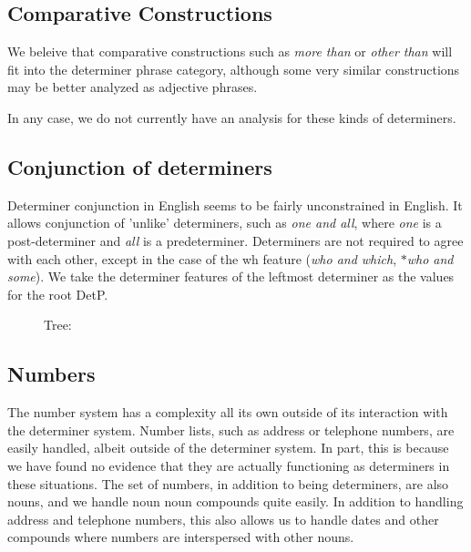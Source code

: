 \subsection{Comparative Constructions}

We beleive that comparative constructions such as {\it more than\/} or
{\it other than\/}
will fit into the determiner phrase category, although some very
similar constructions may be better analyzed  as adjective phrases.

    
In any case, we do not currently have an analysis for these kinds of
determiners.

\subsection{Conjunction of determiners}

Determiner conjunction in English seems to be  fairly unconstrained in English.  It allows conjunction of 'unlike'
determiners, such as {\it one and all}, where {\it one\/} is a post-determiner
and {\it all\/}
is a predeterminer.  Determiners are not required to agree with each other,
except in the case of the wh feature ({\it who and which}, {\it $\ast$who and some}).  We
take the determiner features of the leftmost determiner as the values for the
root DetP.

\begin{figure}[ht]
\centering
{}
\caption{ Tree:  }
\end{figure}

\subsection{Numbers}

The number system has a complexity all its own outside of its interaction with
the determiner system.  Number lists, such as address or telephone numbers, are
easily handled, albeit outside of the determiner system.  In part, this is
because we have found no evidence that they are actually functioning as
determiners in these situations.  The set of numbers, in addition to being
determiners, are also nouns, and we handle noun noun compounds quite easily.
In addition to handling address and telephone numbers, this also allows us to
handle dates and other compounds where numbers are interspersed with other nouns.

